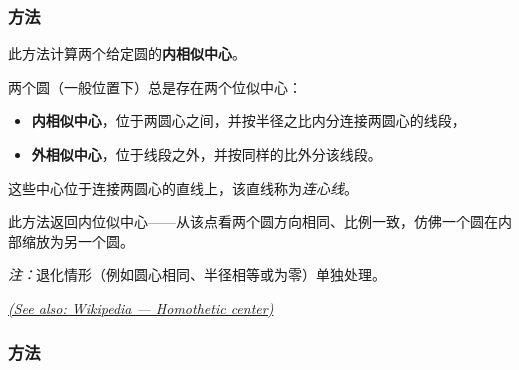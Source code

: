 \subsubsection{方法 }
\label{ssub:method_circle_internal__similitude}

此方法计算两个给定圆的\textbf{内相似中心}。

\medskip

两个圆（一般位置下）总是存在两个位似中心：
\begin{itemize}
  \item \textbf{内相似中心}，位于两圆心之间，并按半径之比内分连接两圆心的线段，
  \item \textbf{外相似中心}，位于线段之外，并按同样的比外分该线段。
\end{itemize}


这些中心位于连接两圆心的直线上，该直线称为\emph{连心线}。

\medskip

此方法返回内位似中心——从该点看两个圆方向相同、比例一致，仿佛一个圆在内部缩放为另一个圆。

\medskip

\emph{注：}退化情形（例如圆心相同、半径相等或为零）单独处理。
\begin{flushright}
\small
\href{https://en.wikipedia.org/wiki/Homothetic_center}{\textit{(See also: Wikipedia — Homothetic center)}}
\end{flushright}

\vspace{1em}


\begin{tkzexample}[latex=.5\textwidth]
 \begin{center}
 \end{center}
\end{tkzexample}

\subsubsection{方法 }
\label{ssub:method_circle_external__similitude}


